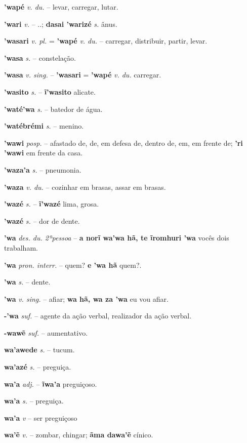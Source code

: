 \textbf{'wapé} \textit{v. du.} -- levar, carregar, lutar.

\textbf{'wari} \textit{v.} -- ..; \textbf{dasai 'warizé} \textit{s.} ânus.

\textbf{'wasari} \textit{v. pl.} = \textbf{'wapé} \textit{v. du.} -- carregar, distribuir, partir, levar.

\textbf{'wasa} \textit{s.} -- constelação.

\textbf{'wasa} \textit{v. sing.} -- \textbf{'wasari} = \textbf{'wapé} \textit{v. du.} carregar.

\textbf{'wasito} \textit{s.} -- \textbf{ĩ'wasito} alicate.

\textbf{'waté'wa} \textit{s.} -- batedor de água.

\textbf{'watébrémi} \textit{s.} -- menino.

\textbf{'wawi} \textit{posp.} -- afastado de, de, em defesa de, dentro de, em, em frente de; \textbf{'ri 'wawi} em frente da casa.

\textbf{'waza'a} \textit{s.} -- pneumonia.

\textbf{'waza} \textit{v. du.} -- cozinhar em brasas, assar em brasas.

\textbf{'wazé} \textit{s.} -- \textbf{ĩ'wazé} lima, grosa.

\textbf{'wazé} \textit{s.} -- dor de dente.

\textbf{'wa} \textit{des. du. 2ªpessoa} -- \textbf{a norĩ wa'wa hã, te ĩromhuri 'wa} vocês dois trabalham.

\textbf{'wa} \textit{pron. interr.} -- quem? \textbf{e 'wa hã} quem?.

\textbf{'wa} \textit{s.} -- dente.

\textbf{'wa} \textit{v. sing.} -- afiar; \textbf{wa hã, wa za 'wa} eu vou afiar.

\textbf{-'wa} \textit{suf.} -- agente da ação verbal, realizador da ação verbal.

\textbf{-wawẽ} \textit{suf.} -- aumentativo.

\textbf{wa'awede} \textit{s.} -- tucum.

\textbf{wa'azé} \textit{s.} -- preguiça.

\textbf{wa'a} \textit{adj.} -- \textbf{ĩwa'a} preguiçoso.

\textbf{wa'a} \textit{s.} -- preguiça.

\textbf{wa'a} \textit{v} -- {ser preguiçoso}

\textbf{wa'ẽ} \textit{v.} -- zombar, chingar; \textbf{ãma dawa'ẽ} cínico.

